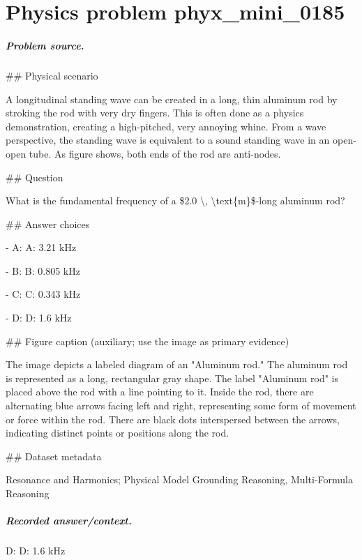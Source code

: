 
\chapter{Physics problem phyx\_mini\_0185}
\label{ch:PhyXMiniProblems_problem_phyx_mini_0185}

\paragraph{Problem source.}
\#\# Physical scenario

A longitudinal standing wave can be created in a long, thin aluminum rod by stroking the rod with very dry fingers. This is often done as a physics demonstration, creating a high-pitched, very annoying whine. From a wave perspective, the standing wave is equivalent to a sound standing wave in an open-open tube. As figure shows, both ends of the rod are anti-nodes.

\#\# Question

What is the fundamental frequency of a \$2.0 \textbackslash{}, \textbackslash{}text\{m\}\$-long aluminum rod?

\#\# Answer choices

- A: A: 3.21 kHz

- B: B: 0.805 kHz

- C: C: 0.343 kHz

- D: D: 1.6 kHz

\#\# Figure caption (auxiliary; use the image as primary evidence)

The image depicts a labeled diagram of an "Aluminum rod." The aluminum rod is represented as a long, rectangular gray shape. The label "Aluminum rod" is placed above the rod with a line pointing to it. Inside the rod, there are alternating blue arrows facing left and right, representing some form of movement or force within the rod. There are black dots interspersed between the arrows, indicating distinct points or positions along the rod.

\#\# Dataset metadata

Resonance and Harmonics; Physical Model Grounding Reasoning, Multi-Formula Reasoning

\paragraph{Recorded answer/context.}
D: D: 1.6 kHz

